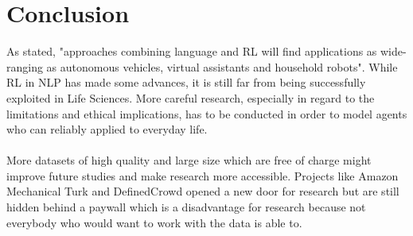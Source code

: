 \documentclass[11pt,a4paper]{article}
\begin{document}
\section{Conclusion}
As  \citet{ijcai2019} stated, "approaches combining language and RL will find applications as wide-ranging as autonomous vehicles, virtual assistants and household robots". While RL in NLP has made some advances, it is still far from being successfully exploited in Life Sciences. More careful research, especially in regard to the limitations and ethical implications, has to be conducted in order to model agents who can reliably applied to everyday life. \\\\
More datasets of high quality and large size which are free of charge might improve future studies and make research more accessible. Projects like Amazon Mechanical Turk and DefinedCrowd opened a new door for research but are still hidden behind a paywall which is a disadvantage for research because not everybody who would want to work with the data is able to.

\newpage

\end{document}
